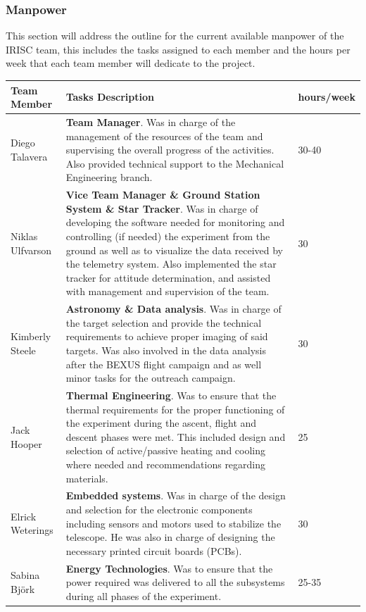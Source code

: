 \subsubsection{Manpower}

This section will address the outline for the current available manpower of the IRISC team, this includes the tasks assigned to each member and the hours per week that each team member will dedicate to the project.

\begin{longtable}{m{} | m{} | m{}}
	\textbf{Team Member} & \textbf{Tasks Description} & \textbf{hours/week} \\ \hline
	Diego Talavera  & \textbf{Team Manager}. Was in charge of the management of the resources of the team and supervising the overall progress of the activities. Also provided technical support to the Mechanical Engineering branch. &  30-40 \\ \hline
	Niklas Ulfvarson & \textbf{ Vice Team Manager \& Ground Station System \& Star Tracker}. Was in charge of developing the software needed for monitoring and controlling (if needed) the experiment from the ground as well as to visualize the data received by the telemetry system. Also implemented the star tracker for attitude determination, and assisted with management and supervision of the team. & 30 \\ \hline
	Kimberly Steele & \textbf{Astronomy \& Data analysis}. Was in charge of the target selection and provide the technical requirements to achieve proper imaging of said targets. Was also involved in the data analysis after the BEXUS flight campaign and as well minor tasks for the outreach campaign. & 30 \\ \hline
	Jack Hooper & \textbf{Thermal Engineering}. Was to ensure that the thermal requirements for the proper functioning of the experiment during the ascent, flight and descent phases were met. This included design and selection of active/passive heating and cooling where needed and recommendations regarding materials. & 25 \\ \hline
	Elrick Weterings & \textbf{Embedded systems}. Was in charge of the design and selection for the electronic components including sensors and motors used to stabilize the telescope. He was also in charge of designing the necessary printed circuit boards (PCBs). & 30 \\ \hline
	Sabina Bj{\"o}rk & \textbf{Energy Technologies}. Was to ensure that the power required was delivered to all the subsystems during all phases of the experiment. & 25-35 \\ \hline

\end{longtable}

